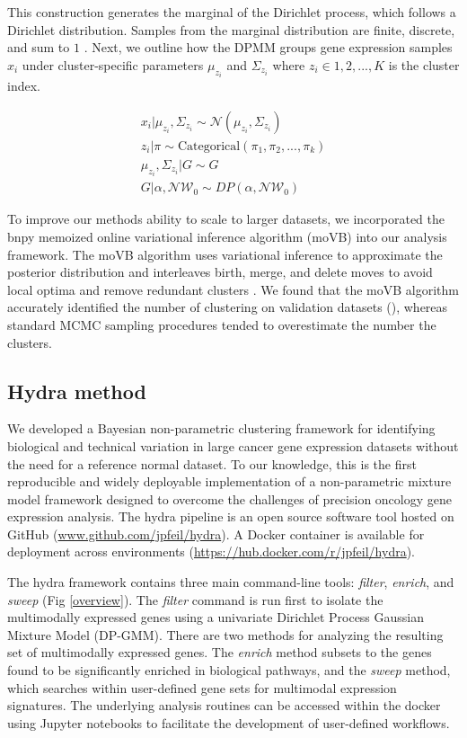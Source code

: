 \documentclass[10pt,letterpaper]{article}
\begin{document}
This construction generates the marginal of the Dirichlet process, which follows a Dirichlet distribution. Samples from the marginal distribution are finite, discrete, and sum to $1$ \cite{fergusonBayesianAnalysisNonparametric1973}. Next, we outline how the DPMM groups gene expression samples $x_i$ under cluster-specific parameters $\mu_{z_i}$ and $\Sigma_{z_i}$ where $z_i \in {1, 2, ..., K}$ is the cluster index.

\begin{gather}
\label{eq:mm}
x_i | \mu_{z_i}, \Sigma_{z_i} \sim \mathcal{N}(\mu_{z_i}, \Sigma_{z_i}) \\
z_i | \pi \sim \text{Categorical}(\pi_1, \pi_2, ..., \pi_k) \\
\mu_{z_i}, \Sigma_{z_i} | G \sim G \\
G | \alpha, \mathcal{NW}_0 \sim DP(\alpha, \mathcal{NW}_0)
\end{gather}

To improve our methods ability to scale to larger datasets, we incorporated the bnpy memoized online variational inference algorithm (moVB) \cite{hughes2013memoized} into our analysis framework. The moVB algorithm uses variational inference to approximate the posterior distribution and interleaves birth, merge, and delete moves to avoid local optima and remove redundant clusters \cite{hughesBnpyReliableScalable}. We found that the moVB algorithm accurately identified the number of clustering on validation datasets (), whereas standard MCMC sampling procedures tended to overestimate the number the clusters.

\subsection*{Hydra method}
We developed a Bayesian non-parametric clustering framework for identifying biological and technical variation in large cancer gene expression datasets without the need for a reference normal dataset. To our knowledge, this is the first reproducible and widely deployable implementation of a non-parametric mixture model framework designed to overcome the challenges of precision oncology gene expression analysis. The hydra pipeline is an open source software tool hosted on GitHub (\url{www.github.com/jpfeil/hydra}). A Docker container is available for deployment across environments (\url{https://hub.docker.com/r/jpfeil/hydra}).

The hydra framework contains three main command-line tools: \textit{filter}, \textit{enrich}, and \textit{sweep} (Fig \ref{overview}). The \textit{filter} command is run first to isolate the multimodally expressed genes using a univariate Dirichlet Process Gaussian Mixture Model (DP-GMM). There are two methods for analyzing the resulting set of multimodally expressed genes. The \textit{enrich} method subsets to the genes found to be significantly enriched in biological pathways, and the \textit{sweep} method, which searches within user-defined gene sets for multimodal expression signatures. The underlying analysis routines can be accessed within the docker using Jupyter notebooks to facilitate the development of user-defined workflows.
\end{document}
